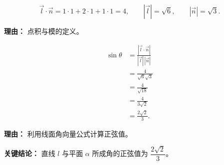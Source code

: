 \begin{examplebox}
\begin{description}[style=nextline, leftmargin=2.8em, labelsep=0.5em, itemsep=0.45em]
		\item[\textbf{第二步（计算点积和模）：}]
		      \[
			      \vec{l}\cdot\vec{n}=1\cdot1+2\cdot1+1\cdot1=4,
			      \qquad
			      |\vec{l}|=\sqrt{6},
			      \qquad
			      |\vec{n}|=\sqrt{3}.
		      \]
		      \par\textbf{理由：}
		      点积与模的定义。

		\item[\textbf{第三步（代入公式）：}]
		      \[
			      \begin{aligned}
				      \sin\theta
				       & = \frac{|\vec{l}\cdot\vec{n}|}{|\vec{l}|\,|\vec{n}|} \\
				       & = \frac{4}{\sqrt{6}\sqrt{3}}                         \\
				       & = \frac{4}{\sqrt{18}}                                \\
				       & = \frac{4}{3\sqrt{2}}                                \\
				       & = \frac{2\sqrt{2}}{3}.
			      \end{aligned}
		      \]
		      \par\textbf{理由：}
		      利用线面角向量公式计算正弦值。
	\end{description}

	\textbf{\textcolor{CExample}{关键结论：}} 直线 $l$ 与平面 $\alpha$ 所成角的正弦值为 $\dfrac{2\sqrt{2}}{3}$。

\end{examplebox}